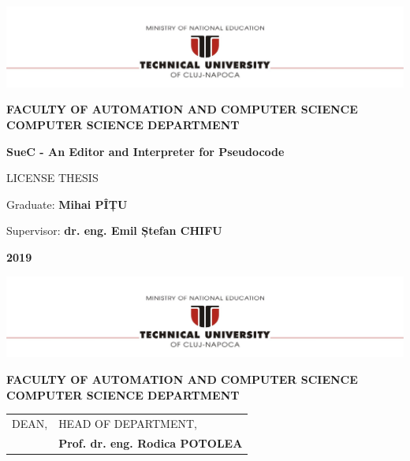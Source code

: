 \documentclass[12pt,a4paper,twoside]{report}
\renewcommand{\thesisauthor}{Mihai PÎȚU}    %
\renewcommand{\thesisyear}{2019}      %
\renewcommand{\thesistitle}{SueC - An Editor and Interpreter for Pseudocode}
\renewcommand{\thesissupervisor}{dr. eng. Emil Ștefan CHIFU}
\newcommand{\department}{\bf FACULTY OF AUTOMATION AND COMPUTER SCIENCE\\
COMPUTER SCIENCE DEPARTMENT}
\newcommand{\utcnlogo}{\includegraphics[width=15cm]{img/tucn.jpg}}
\begin{document}

\newenvironment{definition}[1][Defini\c{t}ie.]{\begin{trivlist}
\item[\hskip \labelsep {\bfseries #1}]}{\end{trivlist}}




\setcounter{page}{4}



\begin{center}
\utcnlogo

\department

\vspace{4cm}

{\bf \thesistitle} %

\vspace{1.5cm}

LICENSE THESIS

\vspace{6cm}

Graduate: {\bf \thesisauthor} 

Supervisor: {\bf \thesissupervisor}

\vspace{3cm}
{\bf \thesisyear}
\end{center}

\thispagestyle{empty}
\newpage

\begin{center}
\utcnlogo

\department

\end{center}
\vspace{0.5cm}

\begin{tabular}{p{7cm}p{8cm}}
 \hspace{-1cm}DEAN, & HEAD OF DEPARTMENT,\\
 \hspace{-1cm}{\bf Prof. dr. eng. Liviu MICLEA} & {\bf Prof. dr. eng. Rodica POTOLEA}\\  
\end{tabular}
 
\end{document}
